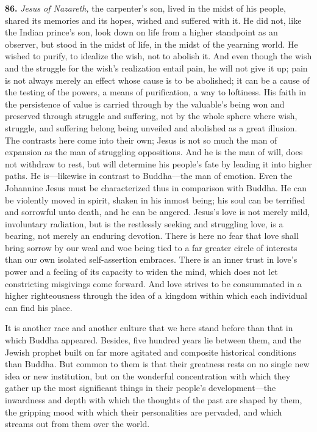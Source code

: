 \documentclass[12pt,a4paper]{book}
\newcommand{\opage}[1]{\marginnote{\footnotesize\textit{[#1]}}}
\begin{document}
\medskip

\noindent\textbf{86.} \emph{Jesus of Nazareth,} the carpenter's son, lived in the midst of his people,
shared its memories and its hopes, wished and suffered with it. He did not, like the Indian prince's son,
look down on life from a higher standpoint as an observer, but stood in the midst of life, in the midst of
the yearning world. He wished to purify, to idealize the wish, not to 
\opage{199}abolish it. And even though the wish
and the struggle for the wish's realization entail pain, he will not give it up; pain is not always merely
an effect whose cause is to be abolished; it can be a cause of the testing of the powers, a means of
purification, a way to loftiness. His faith in the persistence of value is carried through by the valuable's
being won and preserved through struggle and suffering, not by the whole sphere where wish, struggle, and
suffering belong being unveiled and abolished as a great illusion. The contrasts here come into their own;
Jesus is not so much the man of expansion as the man of struggling oppositions. And he is the man of will,
does not withdraw to rest, but will determine his people's fate by leading it into higher paths. He
is---likewise in contrast to Buddha---the man of emotion. Even the Johannine Jesus must be characterized
thus in comparison with Buddha. He can be violently moved in spirit, shaken in his inmost being; his soul
can be terrified and sorrowful unto death, and he can be angered. Jesus's love is not merely mild,
involuntary radiation, but is the restlessly seeking and struggling love, is a bearing, not merely an
enduring devotion. There is here no fear that love shall bring sorrow by our weal and woe being tied to a
far greater circle of interests than our own isolated self-assertion embraces. There is an inner trust in
love's power and a feeling of its capacity to widen the mind, which does not let constricting misgivings
come forward. And love strives to be consummated in a higher righteousness through the idea of a kingdom
within which each individual can find his place.

It is another race and another culture that we here stand before than that in which Buddha appeared.
Besides, five hundred years lie between them, and the Jewish prophet built on far more agitated and
composite historical conditions than Buddha. But common to them is that their greatness rests on no single
new idea or new institution, but on the wonderful concentration with which they gather up the most
significant things in their people's development---the inwardness and depth with which the thoughts of the
past are shaped by them, the gripping mood with which their personalities are pervaded, and which streams
out from them over the world.
\end{document}

